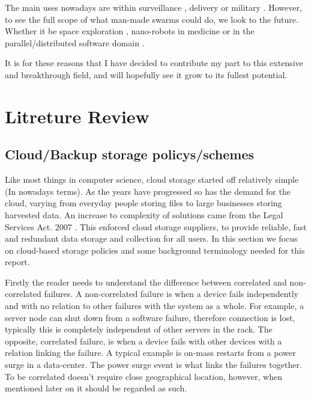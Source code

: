 \documentclass{UoYCSproject}
\begin{document}
The main uses nowadays are within surveillance \cite{UAV, HiveMind}, delivery or military \cite{Swarm robotics reviewed}.
However, to see the full scope of what man-made swarms could do, we look to the future.
Whether it be space exploration \cite{Space exploration}, nano-robots in medicine or in the parallel/distributed software domain \cite{blockchainandSwarm}.

It is for these reasons that I have decided to contribute my part to this extensive and breakthrough field, and will hopefully see it grow to its fullest potential.


\chapter{Litreture Review}
\label{cha:Litreture Review}

\section{Cloud/Backup storage policys/schemes}
\label{sec:Cloud}

Like most things in computer science, cloud storage started off relatively simple (In nowadays terms).
As the years have progressed so has the demand for the cloud, varying from everyday people storing files to large businesses storing harvested data.
An increase to complexity of solutions came from the Legal Services Act. 2007 \cite{LSA}.
This enforced cloud storage suppliers, to provide reliable, fast and redundant data storage and collection for all users.
In this section we focus on cloud-based storage policies and some background terminology needed for this report.

Firstly the reader needs to understand the difference between correlated and non-correlated failures.
A non-correlated failure is when a device fails independently and with no relation to other failures with the system as a whole.
For example, a server node can shut down from a software failure, therefore connection is lost, typically this is completely independent of other servers in the rack.
The opposite, correlated failure, is when a device fails with other devices with a relation linking the failure.
A typical example is on-mass restarts from a power surge in a data-center.
The power surge event is what links the failures together.
To be correlated doesn't require close geographical location, however, when mentioned later on it should be regarded as such.
\end{document}
